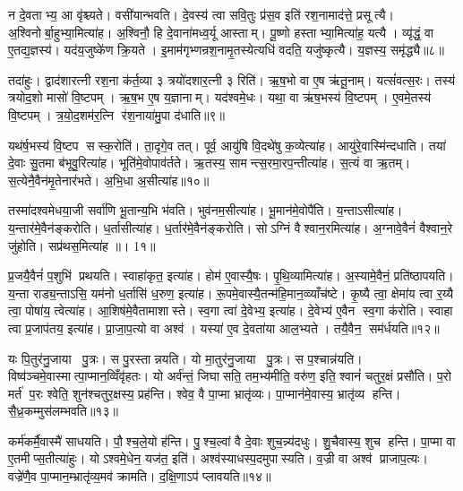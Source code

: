 न दे॒वताभ्य॒ आ वृ॑श्च्यते। वसी॑यान्भवति। दे॒वस्य॑ त्वा सवि॒तुः प्र॑स॒व इति॑ रश॒नामाद॑त्ते॒ प्रसूत्यै। अ॒श्विनोर्बा॒हुभ्या॒मित्या॑ह। अ॒श्विनौ॒ हि दे॒वाना॑मध्व॒र्यू आस्ताम्। पू॒ष्णो हस्ताभ्या॒मित्या॑ह॒ यत्यै। व्यृ॑द्धं॒ वा ए॒तद्य॒ज्ञस्य॑। यद॑य॒जुष्के॑ण क्रि॒यते। इ॒माम॑गृभ्णन्रश॒नामृ॒तस्येत्यधि॑ वदति॒ यजु॑ष्कृत्यै। य॒ज्ञस्य॒ समृ॑द्ध्यै॥८॥

तदा॑हुः। द्वाद॑शारत्नी रश॒ना क॑र्त॒व्या ३ त्रयो॑दशार॒त्नी ३ रिति॑। ऋ॒ष॒भो वा ए॒ष ऋ॑तू॒नाम्। यत्सं॑वत्स॒रः। तस्य॑ त्रयोद॒शो मासो॑ वि॒ष्टपम्। ऋ॒ष॒भ ए॒ष य॒ज्ञानाम्। यद॑श्वमे॒धः। यथा॒ वा ऋ॑ष॒भस्य॑ वि॒ष्टपम्। ए॒वमे॒तस्य॑ वि॒ष्टपम्। त्र॒यो॒द॒शम॑र॒त्नि र॑श॒नाया॑मु॒पा द॑धाति॥९॥

यथ॑र्\mbox{}ष॒भस्य॑ वि॒ष्टप सस्क॒रोति॑। ता॒दृगे॒व तत्। पूर्व॒ आयु॑षि वि॒दथे॑षु क॒व्येत्या॑ह। आयु॑रे॒वास्मि॑न्दधाति। तया॑ दे॒वाः सु॒तमा ब॑भूवु॒रित्या॑ह। भूति॑मे॒वोपाव॑र्तते। ऋ॒तस्य॒ सामन्त्स॒रमा॒रप॒न्तीत्या॑ह। स॒त्यं वा ऋ॒तम्। स॒त्येनै॒वैन॑मृ॒तेनार॑भते। अ॒भि॒धा अ॒सीत्या॑ह॥१०॥

तस्मा॑दश्वमेधया॒जी सर्वा॑णि भू॒तान्य॒भि भ॑वति। भुव॑नम॒सीत्या॑ह। भू॒मान॑मे॒वोपै॑ति। य॒न्ताऽसीत्या॑ह। य॒न्तार॑मे॒वैन॑ङ्करोति। ध॒र्तासीत्या॑ह। ध॒र्तार॑मे॒वैन॑ङ्करोति। सोऽग्निं वैश्वान॒रमित्या॑ह। अ॒ग्नावे॒वैनं॑ वैश्वान॒रे जु॑होति। सप्र॑थस॒मित्या॑ह ॥। 1१॥

प्र॒जयै॒वैनं॑ प॒शुभि॑ प्रथयति। स्वाहा॑कृत॒ इत्या॑ह। होम॑ ए॒वास्यै॒षः। पृ॒थि॒व्यामित्या॑ह। अ॒स्यामे॒वैनं॒ प्रति॑ष्ठापयति। य॒न्ता राड्य॒न्ताऽसि॒ यम॑नो ध॒र्तासि॑ ध॒रुण॒ इत्या॑ह। रू॒पमे॒वास्यै॒तन्म॑हि॒मान॒व्व्याँच॑ष्टे। कृ॒ष्यै त्वा॒ क्षेमा॑य त्वा र॒य्यै त्वा॒ पोषा॑य॒ त्वेत्या॑ह। आ॒शिष॑मे॒वैतामाशास्ते। स्व॒गा त्वा॑ दे॒वेभ्य॒ इत्या॑ह। दे॒वेभ्य॑ ए॒वैन स्व॒गा क॑रोति। स्वाहा त्वा प्र॒जाप॑तय॒ इत्या॑ह। प्रा॒जा॒प॒त्यो वा अश्व॑। यस्या॑ ए॒व दे॒वता॑या आल॒भ्यते। तयै॒वैन॒ सम॑र्धयति॥१२॥\anuvakamend[ब॒ध्ना॒ति॒ समृ॑द्ध्या उ॒पाद॑धात्य॒सीत्या॑ह॒ सप्र॑थस॒मित्या॑ह दे॒वेभ्य॒ इत्या॑ह॒ पञ्च॑ च]

यः पि॒तुर॑नु॒जाया पु॒त्रः। स पु॒रस्तान्नयति। यो मा॒तुर॑नु॒जाया पु॒त्रः। स प॒श्चान्न॑यति। विष्व॑ञ्चमे॒वास्मात्पा॒प्मान॒व्विँवृ॑हतः। यो अर्व॑न्तं॒ जिघासति॒ तम॒भ्य॑मीति॒ वरु॑ण॒ इति॒ श्वानं॑ चतुर॒क्षं प्रसौ॑ति। प॒रो मर्त॑ प॒रः श्वेति॒ शुन॑श्चतुर॒क्षस्य॒ प्रह॑न्ति। श्वेव॒ वै पा॒प्मा भ्रातृ॑व्यः। पा॒प्मान॑मे॒वास्य॒ भ्रातृ॑व्य हन्ति। सै॒ध्र॒कम्मुस॑लम्भवति॥१३॥

कर्म॑कर्मै॒वास्मै॑ साधयति। पौ॒श्च॒ले॒यो ह॑न्ति। पु॒श्च॒ल्वां वै दे॒वाः शुच॒न्न्य॑दधुः। शु॒चैवास्य॒ शुच हन्ति। पा॒प्मा वा ए॒तमीप्स॒तीत्या॑हुः। योऽश्वमे॒धेन॒ यज॑त॒ इति॑। अश्व॑स्याधस्प॒दमुपास्यति। व॒ज्री वा अश्व॑ प्राजाप॒त्यः। वज्रे॑णै॒व पा॒प्मान॒म्भ्रातृ॑व्य॒मव॑ क्रामति। द॒क्षि॒णाऽप॑ प्लावयति॥१४॥

